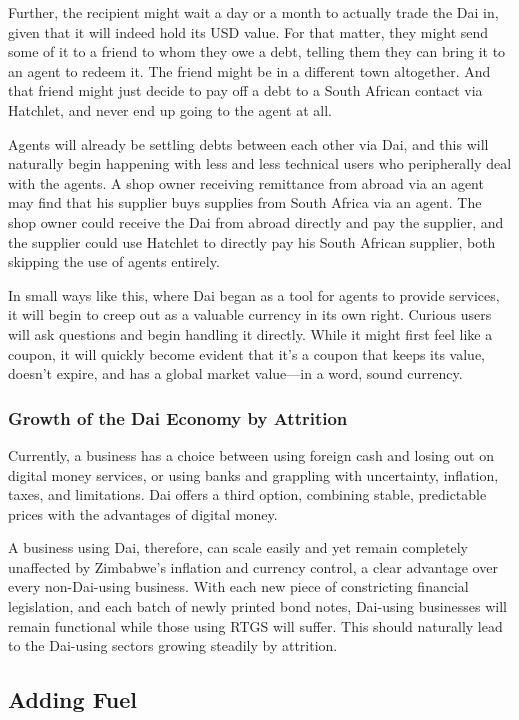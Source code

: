 \documentclass{article}
\begin{document}
Further, the recipient might wait a day or a month to actually trade the Dai in, given that it will indeed hold its USD value. For that matter, they might send some of it to a friend to whom they owe a debt, telling them they can bring it to an agent to redeem it. The friend might be in a different town altogether. And that friend might just decide to pay off a debt to a South African contact via Hatchlet, and never end up going to the agent at all.

Agents will already be settling debts between each other via Dai, and this will naturally begin happening with less and less technical users who peripherally deal with the agents. A shop owner receiving remittance from abroad via an agent may find that his supplier buys supplies from South Africa via an agent. The shop owner could receive the Dai from abroad directly and pay the supplier, and the supplier could use Hatchlet to directly pay his South African supplier, both skipping the use of agents entirely.

In small ways like this, where Dai began as a tool for agents to provide services, it will begin to creep out as a valuable currency in its own right. Curious users will ask questions and begin handling it directly. While it might first feel like a coupon, it will quickly become evident that it's a coupon that keeps its value, doesn't expire, and has a global market value---in a word, sound currency.

\subsubsection{Growth of the Dai Economy by Attrition} \label{fittest}

Currently, a business has a choice between using foreign cash and losing out on digital money services, or using banks and grappling with uncertainty, inflation, taxes, and limitations. Dai offers a third option, combining stable, predictable prices with the advantages of digital money.

A business using Dai, therefore, can scale easily and yet remain completely unaffected by Zimbabwe's inflation and currency control, a clear advantage over every non-Dai-using business. With each new piece of constricting financial legislation, and each batch of newly printed bond notes, Dai-using businesses will remain functional while those using RTGS will suffer. This should naturally lead to the Dai-using sectors growing steadily by attrition.

\subsection{Adding Fuel} \label{fuel}
\end{document}
